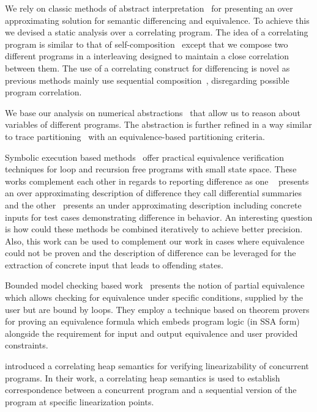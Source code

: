 We rely on classic methods of abstract interpretation~\cite{CousotCousot77} for presenting an over approximating solution for semantic differencing and equivalence. To achieve this we devised a static analysis over a correlating program. The idea of a correlating program is similar to that of self-composition~\cite{AikenTerauchi05} except that we compose two different programs in a interleaving designed to maintain a close correlation between them. The use of a correlating construct for differencing is novel as previous methods mainly use sequential composition~\cite{GodlinStrichman09, DwyerElbaumPerson08, EnglerRamos11}, disregarding possible program correlation.

We base our analysis on numerical abstractions~\cite{CousotHalbwachs78, Mine2006} that allow us to reason about variables of different programs. The abstraction is further refined in a way similar to trace partitioning~\cite{MauborgneRival07} with an equivalence-based partitioning criteria.

Symbolic execution based methods~\cite{DwyerElbaumPerson08, EnglerRamos11} offer practical equivalence verification techniques for loop and recursion free programs with small state space. These works complement each other in regards to reporting difference as one ~\cite{DwyerElbaumPerson08} presents an over approximating description of difference they call differential summaries and the other~\cite{EnglerRamos11} presents an under approximating description including concrete inputs for test cases demonstrating difference in behavior. An interesting question is how could these methods be combined iteratively to achieve better precision. Also, this work can be used to complement our work in cases where equivalence could not be proven and the description of difference can be leveraged for the extraction of concrete input that leads to offending states.

Bounded model checking based work~\cite{GodlinStrichman09} presents the notion of partial equivalence which allows checking for equivalence under specific conditions, supplied by the user but are bound by loops. They employ a technique based on theorem provers for proving an equivalence formula which embeds program logic (in SSA form) alongside the requirement for input and output equivalence and user provided constraints.

\cite{AmitRinetzkyRepsSagivYahav07} introduced a correlating heap semantics for verifying linearizability of concurrent programs. In their work, a correlating heap semantics is used to establish correspondence between a concurrent program and a sequential version of the program at specific linearization points.



